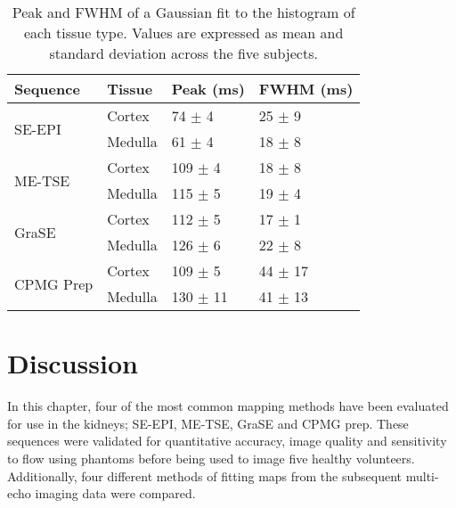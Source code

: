 \begin{table}[H]
	\centering
	\begin{tabular}{ll|l|l}
		Sequence                         & Tissue  & Peak (ms)  & FWHM (ms) \\ \hline
		\multirow{2}{*}{SE-EPI}          & Cortex  & 74 $\pm$ 4   & 25 $\pm$ 9  \\ \cline{2-4} 
		& Medulla & 61 $\pm$ 4   & 18 $\pm$ 8  \\ \hline
		\multirow{2}{*}{ME-TSE}          & Cortex  & 109 $\pm$ 4  & 18 $\pm$ 8  \\ \cline{2-4} 
		& Medulla & 115 $\pm$ 5  & 19 $\pm$ 4  \\ \hline
		\multirow{2}{*}{GraSE}           & Cortex  & 112 $\pm$ 5  & 17 $\pm$ 1  \\ \cline{2-4} 
		& Medulla & 126 $\pm$ 6  & 22 $\pm$ 8  \\ \hline
		\multirow{2}{*}{CPMG \ttwo Prep} & Cortex  & 109 $\pm$ 5  & 44 $\pm$ 17 \\ \cline{2-4} 
		& Medulla & 130 $\pm$ 11 & 41 $\pm$ 13
	\end{tabular}
	\caption{Peak and \ac{FWHM} of a Gaussian fit to the histogram of each tissue type. Values are expressed as mean and standard deviation across the five subjects.}
	\label{tab:t2_hist}
\end{table}


\newpage

\section{Discussion}

In this chapter, four of the most common \ttwo mapping methods have been evaluated for use in the kidneys; \ac{SE}-\ac{EPI}, \ac{ME-TSE}, \ac{GraSE} and \ac{CPMG} \ttwo prep. These sequences were validated for quantitative accuracy, image quality and sensitivity to flow using phantoms before being used to image five healthy volunteers. Additionally, four different methods of fitting \ttwo maps from the subsequent multi-echo imaging data were compared.

